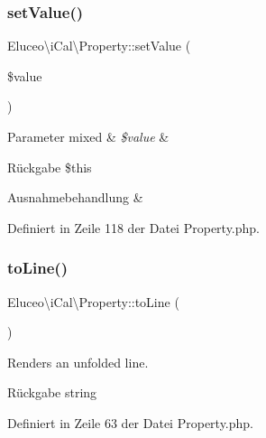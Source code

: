\subsubsection{\texorpdfstring{set\+Value()}{setValue()}\hspace{0.1cm}{\footnotesize\ttfamily [3/3]}}
{\footnotesize\ttfamily Eluceo\textbackslash{}i\+Cal\textbackslash{}\+Property\+::set\+Value (\begin{DoxyParamCaption}\item[{}]{\$value }\end{DoxyParamCaption})}


\begin{DoxyParams}[1]{Parameter}
mixed & {\em \$value} & \\
\hline
\end{DoxyParams}
\begin{DoxyReturn}{Rückgabe}
\$this
\end{DoxyReturn}

\begin{DoxyExceptions}{Ausnahmebehandlung}
{\em } & \\
\hline
\end{DoxyExceptions}


Definiert in Zeile 118 der Datei Property.\+php.

\mbox{\label{class_eluceo_1_1i_cal_1_1_property_a8b154e23bd0673f5afb2b6fd450991f2}} 
\subsubsection{\texorpdfstring{to\+Line()}{toLine()}\hspace{0.1cm}{\footnotesize\ttfamily [1/3]}}
{\footnotesize\ttfamily Eluceo\textbackslash{}i\+Cal\textbackslash{}\+Property\+::to\+Line (\begin{DoxyParamCaption}{ }\end{DoxyParamCaption})}

Renders an unfolded line.

\begin{DoxyReturn}{Rückgabe}
string 
\end{DoxyReturn}


Definiert in Zeile 63 der Datei Property.\+php.

\mbox{\label{class_eluceo_1_1i_cal_1_1_property_a8b154e23bd0673f5afb2b6fd450991f2}} 
